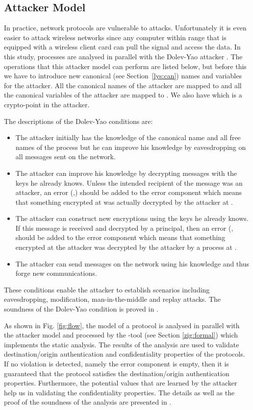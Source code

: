 \subsection{Attacker Model}
In practice, network protocols are vulnerable to attacks. 
Unfortunately it is even easier to attack wireless networks since any computer within range that is equipped with a wireless client card can pull the signal and access the data.
In this study, \LYSA processes are analysed in parallel with the Dolev-Yao attacker \cite{dol:yao}. 
The operations that this attacker model can perform are listed below, 
but before this we have to introduce new canonical (see Section~\ref{lys:can}) names and variables for the attacker.
All the canonical names of the attacker are mapped to  and all the canonical variables of the attacker are mapped to . 
We also have  which is a crypto-point in the attacker.

The descriptions of the Dolev-Yao conditions are:
\begin{itemize}
  \item The attacker initially has the knowledge of the canonical name  and all free names of the process  but he can improve his knowledge by eavesdropping on all messages sent on the network.
  \item The attacker can improve his knowledge by decrypting messages with the keys he already knows. Unless the intended recipient of the message was an attacker, an error (,) should be added to the error component  which means that something encrypted at  was actually decrypted by the attacker at .
  \item The attacker can construct new encryptions using the keys he already knows. If this message is received and decrypted by a principal, then an error (, should be added to the error component 
       which means that something encrypted at the attacker was decrypted by the attacker by a process  at .
  \item The attacker can send messages on the network using his knowledge and thus forge new  communications.
\end{itemize}

These conditions enable the attacker to establish scenarios including eavesdropping, modification, man-in-the-middle and replay attacks. 
The soundness of the Dolev-Yao condition is proved in \cite{bod:1}.

As shown in Fig. \ref{fig:flow}, the \LYSA model of a protocol is analysed in parallel with the attacker model and processed by the \LYSA-tool (see Section \ref{zig:formal}) which implements the static analysis. 
The results of the analysis are used to validate destination/origin authentication and confidentiality properties of the protocols. 
If no violation is detected, namely the error component  is empty, then it is guaranteed that the protocol satisfies the destination/origin authentication properties. 
Furthermore, the potential values that are learned by the attacker help us in validating the confidentiality properties. 
The details as well as the proof of the soundness of the analysis are presented in \cite{bod:2}.

